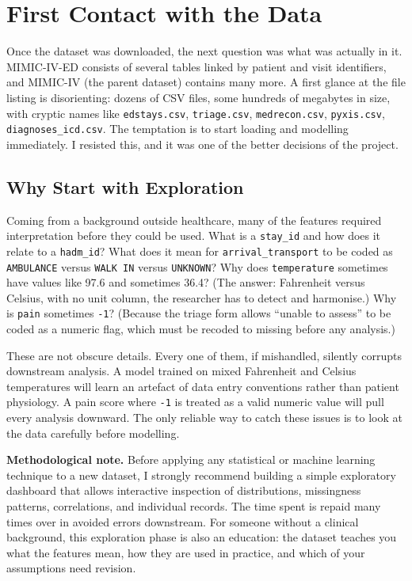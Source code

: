 \section{First Contact with the Data}

Once the dataset was downloaded, the next question was what was actually in it. MIMIC-IV-ED consists of several tables linked by patient and visit identifiers, and MIMIC-IV (the parent dataset) contains many more. A first glance at the file listing is disorienting: dozens of CSV files, some hundreds of megabytes in size, with cryptic names like \texttt{edstays.csv}, \texttt{triage.csv}, \texttt{medrecon.csv}, \texttt{pyxis.csv}, \texttt{diagnoses\_icd.csv}. The temptation is to start loading and modelling immediately. I resisted this, and it was one of the better decisions of the project.

\subsection*{Why Start with Exploration}

Coming from a background outside healthcare, many of the features required interpretation before they could be used. What is a \texttt{stay\_id} and how does it relate to a \texttt{hadm\_id}? What does it mean for \texttt{arrival\_transport} to be coded as \texttt{AMBULANCE} versus \texttt{WALK IN} versus \texttt{UNKNOWN}? Why does \texttt{temperature} sometimes have values like 97.6 and sometimes 36.4? (The answer: Fahrenheit versus Celsius, with no unit column, the researcher has to detect and harmonise.) Why is \texttt{pain} sometimes \texttt{-1}? (Because the triage form allows ``unable to assess'' to be coded as a numeric flag, which must be recoded to missing before any analysis.)

These are not obscure details. Every one of them, if mishandled, silently corrupts downstream analysis. A model trained on mixed Fahrenheit and Celsius temperatures will learn an artefact of data entry conventions rather than patient physiology. A pain score where \texttt{-1} is treated as a valid numeric value will pull every analysis downward. The only reliable way to catch these issues is to look at the data carefully before modelling.

\begin{highlightbox}
\textbf{Methodological note.} Before applying any statistical or machine learning technique to a new dataset, I strongly recommend building a simple exploratory dashboard that allows interactive inspection of distributions, missingness patterns, correlations, and individual records. The time spent is repaid many times over in avoided errors downstream. For someone without a clinical background, this exploration phase is also an education: the dataset teaches you what the features mean, how they are used in practice, and which of your assumptions need revision.
\end{highlightbox}

